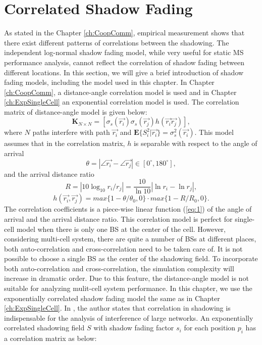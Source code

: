 \section{Correlated Shadow Fading}
\label{CorrShadowField}
As stated in the Chapter \ref{ch:CoopComm}, empirical measurement shows that there exist different patterns of correlations between the shadowing. The independent log-normal shadow fading model, while very useful for static MS performance analysis, cannot reflect the correlation of shadow fading between different locations. In this section, we will give a brief introduction of shadow fading models, including the model used in this chapter.
In Chapter \ref{ch:CoopComm}, a distance-angle correlation model is used and in Chapter \ref{ch:ExpSingleCell} an exponential correlation model is used. The correlation matrix of distance-angle model is given below:
\begin{equation}
\mathbf{K}_{N\times N} = [ \sigma_{s}(\vec{r_{i}})\sigma_{s}(\vec{r_{j}})h(\vec{r_{i}}\vec{r_{j}})],
\label{correlationmatrix}
\end{equation}
where $N$ paths interfere with path $\vec{r_{i}}$ and $\mathbf{E}\{S_{i}^{2}|\vec{r_{i}}\}=\sigma_{s}^{2}(\vec{r_{i}})$. This model assumes that in the correlation matrix, $h$ is separable with respect to the angle of arrival
\begin{equation}
\theta = |\angle\vec{r_{i}}-\angle\vec{r_{j}}|\in [0^{\circ},180^{\circ}],
\end{equation}
and the arrival distance ratio
\begin{equation}
R=|10\log_{10}r_{i}/r_{j}|=\frac{10}{\ln 10}|\ln r_{i}-\ln r_{j}|,
\end{equation}
\begin{equation}
h(\vec{r_{i}},\vec{r_{j}})=max\{1-\theta/\theta_{0},0\}\cdot max\{1-R/R_{0},0\}.
\label{eq:1}
\end{equation}
The correlation coefficients is a piece-wise linear function (\ref{eq:1}) of the angle of arrival and the arrival distance ratio. This correlation model is perfect for single-cell model when there is only one BS at the center of the cell. However, considering multi-cell system, there are quite a number of BSs at different places, both auto-correlation and cross-correlation need to be taken care of. It is not possible to choose a single BS as the center of the shadowing field. To incorporate both auto-correlation and cross-correlation, the simulation complexity will increase in dramatic order. Due to this feature, the distance-angle model is not suitable for analyzing mulit-cell system performance. In this chapter, we use the exponentially correlated shadow fading model \cite{szyszkowicz2011interference} the same as in Chapter \ref{ch:ExpSingleCell}. In \cite{szyszkowicz2011interference}, the author states that correlation in shadowing is indispensable for the analysis of interference of large networks. An exponentially correlated shadowing field $S$ with shadow fading factor $s_{i}$ for each position $p_{i}$ has a correlation matrix as below:
